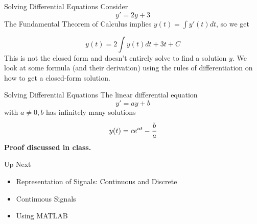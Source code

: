 \documentclass[aspectratio=169,xcolor=dvipsnames,svgnames,x11names,fleqn]{beamer}
\begin{document}
\begin{frame}{Solving Differential Equations}
    Consider 
    $$
    y' = 2y + 3
    $$
    The Fundamental Theorem of Calculus implies $y(t) = \int y'(t) dt$, so we get

    $$
    y(t) = 2\int y(t) dt + 3t + C
    $$
    This is not the closed form and doesn't entirely solve to find a solution $y$. We look at some formula (and their derivation) using the rules of differentiation on how to get a closed-form solution.
\end{frame}

\begin{frame}{Solving Differential Equations}
    The linear differential equation 
    $$
    y' = ay + b
    $$
    with $ a \neq 0, b$ has infinitely many solutions 
    $$
    y(t)= c e^{at}  - \cfrac{b}{a}
    $$
    \bf Proof discussed in class.
    
    \end{frame}

\begin{frame}{Up Next}
\begin{itemize}
    \item Representation of Signals: Continuous and Discrete
    \item Continuous Signals
    \item Using MATLAB
\end{itemize}
    
\end{frame}


\end{document}

